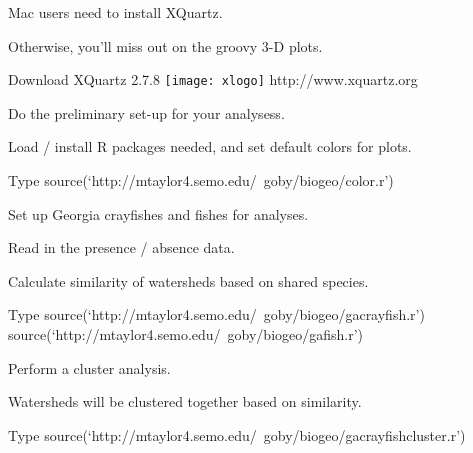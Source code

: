 \documentclass[t]{beamer}
\begin{document}
\begin{frame}[plain]{Mac users need to install XQuartz.}

	\hangpara Otherwise, you'll miss out on the groovy 3-D plots.

\begin{block}{Download XQuartz 2.7.8}
	\texttt{[image: xlogo]} \quad http://www.xquartz.org 
\end{block}
\end{frame}





\begin{frame}[plain]{Do the preliminary set-up for your analysess.}

	\hangpara Load / install R packages needed, and set default colors for plots.

\begin{block}{Type}
	source(`http://mtaylor4.semo.edu/~goby/biogeo/color.r') 
\end{block}
\end{frame}



\begin{frame}[plain]{Set up Georgia crayfishes and fishes for analyses.}

	\hangpara Read in the presence / absence data.
	
	\hangpara Calculate similarity of watersheds based on shared species.

\begin{block}{Type}
	source(`http://mtaylor4.semo.edu/~goby/biogeo/gacrayfish.r') \pause
	source(`http://mtaylor4.semo.edu/~goby/biogeo/gafish.r')
\end{block}
\end{frame}


\begin{frame}[plain]{Perform a cluster analysis.}

\hangpara Watersheds will be clustered together based on similarity. 

\begin{block}{Type}
	source(`http://mtaylor4.semo.edu/~goby/biogeo/gacrayfishcluster.r')
\end{block}

\end{frame}

{
\begin{frame}[plain]
\end{frame}
}
\end{document}
